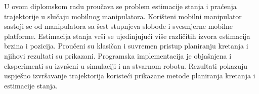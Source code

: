 \documentclass[times, utf8, diplomski, english]{fer}
\begin{document}
\begin{sazetak}
U ovom diplomskom radu proučava se problem estimacije stanja i praćenja trajektorije u slučaju mobilnog manipulatora.
Korišteni mobilni manipulator sastoji se od manipulatora sa šest stupnjeva slobode i svesmjerne mobilne platforme.
Estimacija stanja vrši se ujedinjujući više različitih izvora estimacija brzina i pozicija.
Proučeni su klasičan i suvremen pristup planiranju kretanja i njihovi rezultati su prikazani.
Programska implementacija je objašnjena i eksperimenti su izvršeni u simulaciji i na stvarnom robotu.
Rezultati pokazuju uspješno izvršavanje trajektorija koristeći prikazane metode planiranja kretanja i estimacije stanja.

\end{sazetak}
\end{document}
